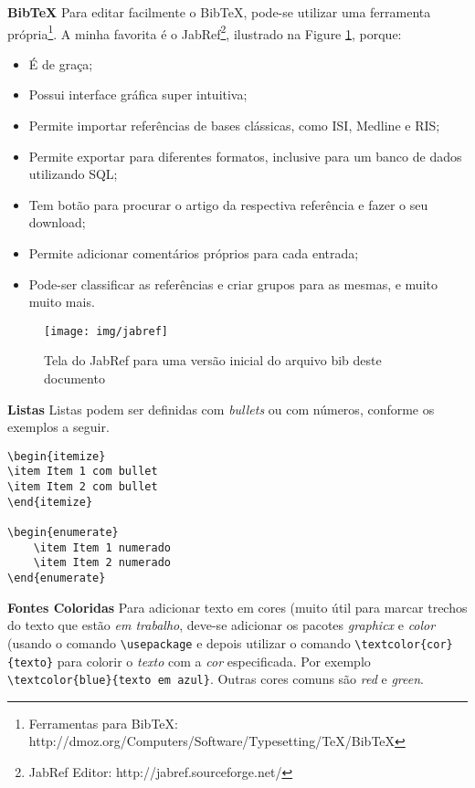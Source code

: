 \begin{anexosenv}
\textbf{BibTeX} Para editar facilmente o BibTeX, pode-se utilizar uma ferramenta própria\footnote{Ferramentas para BibTeX: http://dmoz.org/Computers/Software/Typesetting/TeX/BibTeX}. A minha favorita é o JabRef\footnote{JabRef Editor: http://jabref.sourceforge.net/}, ilustrado na Figure \ref{fig:jabref}, porque:

\begin{itemize}\addtolength{\itemsep}{-0.5\baselineskip}
	\item É de graça;
	\item Possui interface gráfica super intuitiva;
	\item Permite importar referências de bases clássicas, como ISI, Medline e RIS;
	\item Permite exportar para diferentes formatos, inclusive para um banco de dados utilizando SQL;
	\item Tem botão para procurar o artigo da respectiva referência e fazer o seu download;
	\item Permite adicionar comentários próprios para cada entrada;
	\item Pode-ser classificar as referências e criar grupos para as mesmas, e muito muito mais.
\end{itemize}

\begin{figure}[tb]
	\centering
		\texttt{[image: img/jabref]}
	\caption{Tela do JabRef para uma versão inicial do arquivo bib deste documento}
	\label{fig:jabref}
\end{figure}

\textbf{Listas} Listas podem ser definidas com \textit{bullets} ou com números, conforme os exemplos a seguir.

\begin{verbatim}
\begin{itemize}
\item Item 1 com bullet 
\item Item 2 com bullet 
\end{itemize}

\begin{enumerate}
	\item Item 1 numerado
	\item Item 2 numerado
\end{enumerate}
\end{verbatim}

\textbf{Fontes Coloridas} Para adicionar texto em cores (muito útil para marcar trechos do texto que estão \textit{em trabalho}, deve-se adicionar os pacotes \textit{graphicx} e \textit{color} (usando o comando \verb|\usepackage| e depois utilizar o comando \verb|\textcolor{cor}{texto}| para colorir o \textit{texto} com a \textit{cor} especificada. Por exemplo \verb|\textcolor{blue}{texto em azul}|. Outras cores comuns são \textit{red} e \textit{green}.


\end{anexosenv}
